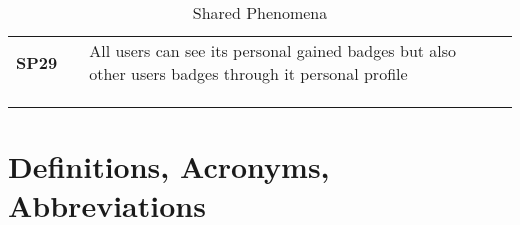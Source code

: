\begin{longtable}[H]{l l p{8.5cm} l l}
    \textbf{SP29}             & \vline & All users can see its personal gained badges but also other users badges through it personal profile                                  & \vline &                        \\
                              &        &                                                                                                                                       &        &                        \\
    \hline                    &        &                                                                                                                                       &        &                        \\
    \caption{Shared Phenomena}
 \end{longtable}

\section{Definitions, Acronyms, Abbreviations}

